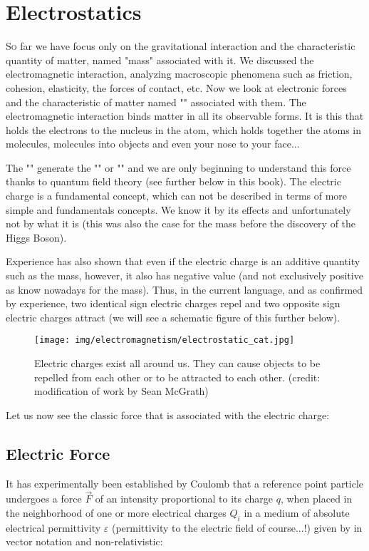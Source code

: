 	\newpage
	\thispagestyle{empty}
	\mbox{}	
	\section{Electrostatics}
	\lettrine[lines=4]{\color{BrickRed}S}o far we have focus only on the gravitational interaction and the characteristic quantity of matter, named "mass" associated with it. We discussed the electromagnetic interaction, analyzing macroscopic phenomena such as friction, cohesion, elasticity, the forces of contact, etc. Now we look at electronic forces and the characteristic of matter named "" associated with them. The electromagnetic interaction binds matter in all its observable forms. It is this that holds the electrons to the nucleus in the atom, which holds together the atoms in molecules, molecules into objects and even your nose to your face...
	
	The "" generate the "" or "\label{coulomb force}" and we are only beginning to understand this force thanks to quantum field theory (see further below in this book). The electric charge is a fundamental concept, which can not be described in terms of more simple and fundamentals concepts. We know it by its effects and unfortunately not by what it is (this was also the case for the mass before the discovery of the Higgs Boson).
	
	Experience has also shown that even if the electric charge is an additive quantity such as the mass, however, it also has negative value (and not exclusively positive as know nowadays for the mass). Thus, in the current language, and as confirmed by experience, two identical sign electric charges repel and two opposite sign electric charges attract (we will see a schematic figure of this further below).
	\begin{figure}[H]
		\centering
		\texttt{[image: img/electromagnetism/electrostatic\_cat.jpg]}
		\caption[]{Electric charges exist all around us. They can cause objects to be repelled from each other or to be attracted to each
other. (credit: modification of work by Sean McGrath)}
	\end{figure}
	Let us now see the classic force that is associated with the electric charge:
	
	\subsection{Electric Force}\label{electric force}
	It has experimentally been established by Coulomb that a reference point particle undergoes a force $\vec{F}$ of an intensity proportional to its charge $q$, when placed in the neighborhood of one or more electrical charges $Q_i$ in a medium of absolute electrical permittivity $\varepsilon$ (permittivity to the electric field of course...!) given by in vector notation and non-relativistic:
	
